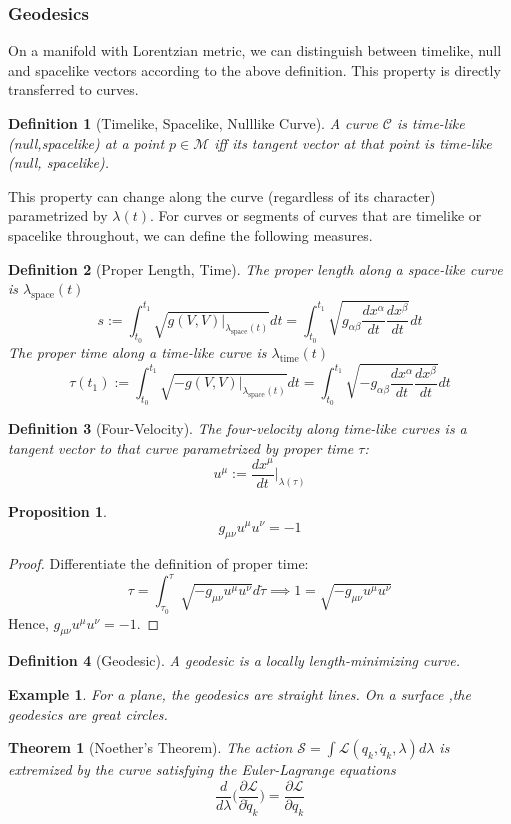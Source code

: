 \documentclass[a4paper]{article}
\newtheorem{eg}{Example}[section]
\theoremstyle{new}
\newtheorem{defi}{Definition}[section]
\newtheorem{thm}{Theorem}[section]
\newtheorem{prop}{Proposition}[section]
\begin{document}
\subsubsection{Geodesics}
On a manifold with Lorentzian metric, we can distinguish between timelike, null and spacelike vectors according to the above definition. This property is directly transferred to curves.
\begin{defi}[Timelike, Spacelike, Nulllike Curve]
A curve $\mathcal{C}$ is time-like (null,spacelike) at a point $p\in\mathcal{M}$ iff its tangent vector at that point is time-like (null, spacelike).
\end{defi}
This property can change along the curve (regardless of its character) parametrized by $\lambda(t)$. For curves or segments of curves that are timelike or spacelike throughout, we can define the following measures.
\begin{defi}[Proper Length, Time]
The proper length along a space-like curve is $\lambda_{\text{space}}(t)$
$$s:=\int_{t_0}^{t_1}\sqrt{g(V,V)|_{\lambda_{\text{space}}(t)}}dt=\int_{t_0}^{t_1}\sqrt{g_{\alpha\beta}\frac{dx^\alpha}{dt}\frac{dx^\beta}{dt}}dt$$
The proper time along a time-like curve is $\lambda_{\text{time}}(t)$
$$\tau(t_1):=\int_{t_0}^{t_1}\sqrt{-g(V,V)|_{\lambda_{\text{space}}(t)}}dt=\int_{t_0}^{t_1}\sqrt{-g_{\alpha\beta}\frac{dx^\alpha}{dt}\frac{dx^\beta}{dt}}dt$$
\end{defi}
\begin{defi}[Four-Velocity]
The four-velocity along time-like curves is a tangent vector to that curve parametrized by proper time $\tau$:
$$u^\mu:=\frac{dx^\mu}{dt}|_{\lambda(\tau)}$$
\end{defi}
\begin{prop}
$$g_{\mu\nu}u^\mu u^\nu=-1$$
\end{prop}
\begin{proof}
Differentiate the definition of proper time:
$$\tau=\int_{\tau_0}^{\tau}\sqrt{-g_{\mu\nu}u^\mu u^\nu}d\tilde{\tau}\implies 1=\sqrt{-g_{\mu\nu}u^\mu u^\nu}$$
Hence, $g_{\mu\nu}u^\mu u^\nu=-1$.
\end{proof}
\begin{defi}[Geodesic]
A geodesic is a locally length-minimizing curve.
\end{defi}
\begin{eg}
For a plane, the geodesics are straight lines. On a surface ,the geodesics are great circles.
\end{eg}
\begin{thm}[Noether's Theorem]
The action $\mathcal{S}=\int\mathcal{L}(q_k,\dot{q}_k,\lambda)d\lambda$ is extremized by the curve satisfying the Euler-Lagrange equations
$$\frac{d}{d\lambda}\bigg(\frac{\partial\mathcal{L}}{\partial\dot{q}_k}\bigg)=\frac{\partial\mathcal{L}}{\partial q_k}$$
\end{thm}
\end{document}
